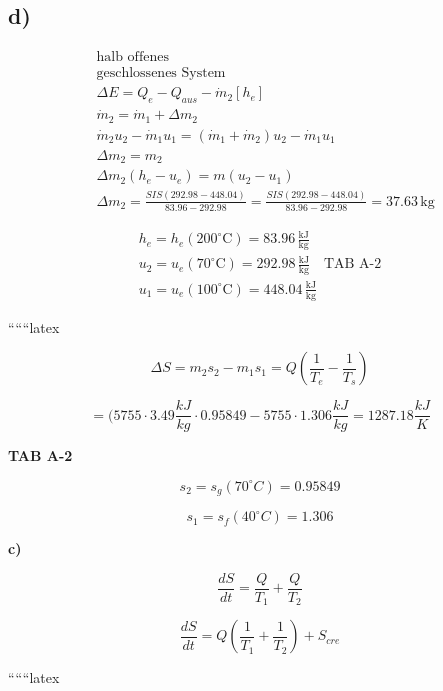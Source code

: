 

\subsection*{d)}

\begin{align*}
&\text{halb offenes} \\
&\text{geschlossenes System} \\
&\Delta E = Q_e - Q_{aus} - \dot{m}_2 [h_e] \\
&\dot{m}_2 = \dot{m}_1 + \Delta m_2 \\
&\dot{m}_2 u_2 - \dot{m}_1 u_1 = (\dot{m}_1 + \dot{m}_2) u_2 - \dot{m}_1 u_1 \\
&\Delta m_2 = m_2 \\
&\Delta m_2 (h_e - u_e) = m (u_2 - u_1) \\
&\Delta m_2 = \frac{SIS (292.98 - 448.04)}{83.96 - 292.98} = \frac{SIS (292.98 - 448.04)}{83.96 - 292.98} = 37.63 \, \text{kg}
\end{align*}

\begin{align*}
h_e = h_e (200^\circ \text{C}) = 83.96 \, \frac{\text{kJ}}{\text{kg}} \\
u_2 = u_e (70^\circ \text{C}) = 292.98 \, \frac{\text{kJ}}{\text{kg}} \quad \text{TAB A-2} \\
u_1 = u_e (100^\circ \text{C}) = 448.04 \, \frac{\text{kJ}}{\text{kg}}
\end{align*}

``````latex

\begin{equation}
\Delta S = m_{2} s_{2} - m_{1} s_{1} = Q \left( \frac{1}{T_{e}} - \frac{1}{T_{s}} \right)
\end{equation}

\begin{equation}
= (5755 \cdot 3.49 \frac{kJ}{kg} \cdot 0.95849 - 5755 \cdot 1.306 \frac{kJ}{kg} = 1287.18 \frac{kJ}{K}
\end{equation}

\textbf{TAB A-2}

\begin{equation}
s_{2} = s_{g}(70^{\circ}C) = 0.95849
\end{equation}

\begin{equation}
s_{1} = s_{f}(40^{\circ}C) = 1.306
\end{equation}

\textbf{c)}

\begin{equation}
\frac{dS}{dt} = \frac{Q}{T_{1}} + \frac{Q}{T_{2}}
\end{equation}

\begin{equation}
\frac{dS}{dt} = Q \left( \frac{1}{T_{1}} + \frac{1}{T_{2}} \right) + S_{cre}
\end{equation}

``````latex
